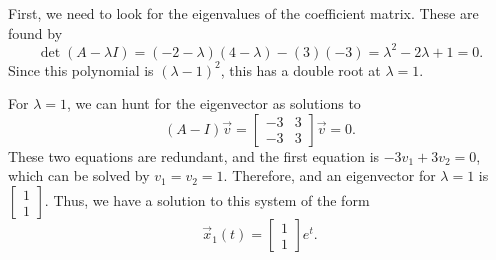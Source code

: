 \documentclass{ximera}
\begin{document}
\begin{exampleSol}
    First, we need to look for the eigenvalues of the coefficient matrix. These are found by
    \begin{equation*}
        \det(A - \lambda I) = (-2-\lambda)(4-\lambda) - (3)(-3) = \lambda^2 - 2\lambda + 1 = 0.
    \end{equation*}
    Since this polynomial is $(\lambda - 1)^2$, this has a double root at $\lambda = 1$. 
    
    For $\lambda = 1$, we can hunt for the eigenvector as solutions to
    \begin{equation*}
        (A - I)\vec{v} = 
        \begin{bmatrix} 
            -3 & 3 \\ 
            -3 & 3 
        \end{bmatrix} \vec{v} = 0.
    \end{equation*}
    These two equations are redundant, and the first equation is $-3v_1 + 3v_2 = 0$, which can be solved by $v_1 = v_2 = 1$. Therefore, and an eigenvector for $\lambda = 1$ is $\left[ \begin{smallmatrix} 1 \\ 1 \end{smallmatrix} \right]$. Thus, we have a solution to this system of the form
    \begin{equation*}
        \vec{x}_1(t) = 
        \begin{bmatrix} 
            1 \\ 
            1 
        \end{bmatrix} e^t.
    \end{equation*}
    

\end{exampleSol}
\end{document}
